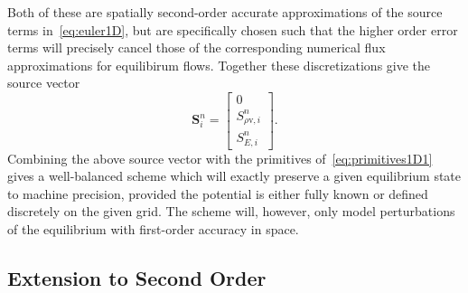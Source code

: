 Both of these are spatially second-order accurate approximations of the source terms in~\eqref{eq:euler1D}, but are specifically chosen such that the higher order error terms will precisely cancel those of the corresponding numerical flux approximations for equilibirum flows. Together these discretizations give the source vector
\begin{equation}
\mathbf{S}_i^n=
\begin{bmatrix}
0 \\ S_{\rho \mathrm{v},i}^n \\ S_{E,i}^n
\end{bmatrix}.
\end{equation}
Combining the above source vector with the primitives of~\eqref{eq:primitives1D1} gives a well-balanced scheme which will exactly preserve a given equilibrium state to machine precision, provided the potential is either fully known or defined discretely on the given grid. The scheme will, however, only model perturbations of the equilibrium with first-order accuracy in space.

\subsection{Extension to Second Order}
\label{subsec:secondOrder}

